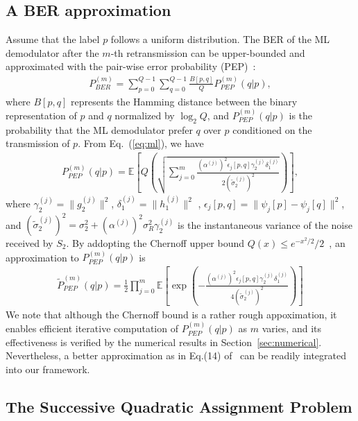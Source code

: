 \documentclass{article}
\begin{document}
\subsection{A BER approximation}
\label{ssec:ber}
Assume that the label $p$ follows a uniform distribution. The BER of
the ML demodulator after the $m$-th retransmission can be upper-bounded and
approximated with the pair-wise error probability (PEP)~\cite{harvind2005symbol}:
\begin{align}
  P_{BER}^{(m)} = \sum_{p=0}^{Q - 1}\sum_{q=0}^{Q - 1}\frac{B[p,
  q]}{Q}P_{PEP}^{(m)}(q|p), \label{eq:P_BER}
\end{align}
where $B[p,q]$ represents the Hamming distance between the binary representation
of $p$ and $q$ normalized by $\log_2Q$, and $P_{PEP}^{(m)}(q|p)$ is the
probability that the ML demodulator prefer $q$ over $p$ conditioned on the
transmission of $p$. From Eq.~(\ref{eq:ml}), we have
\begin{align}
  P_{PEP}^{(m)}(q|p) = \mathbb{E}
  \left[Q\left(\sqrt{\sum_{j=0}^m \frac{(\alpha^{(j)})^2\epsilon_j[p,q]
  \gamma_2^{(j)} \delta_1^{(j)}} {2(\tilde{\sigma}_2^{(j)})^2}}\right)\right],
  \label{eq:PEP_M}
\end{align}
where $\gamma_2^{(j)} = \|g_2^{(j)}\|^2$, $\delta_1^{(j)} = \|h_1^{(j)}\|^2$
, $\epsilon_j[p,q] = \|\psi_j[p]-\psi_j[q]\|^2$, and $(\tilde{\sigma}_2^{(j)})^2
= \sigma_2^2+(\alpha^{(j)})^2\sigma_R^2\gamma_2^{(j)}$ is the instantaneous
variance of the noise received by $S_2$. By addopting the Chernoff upper bound
$Q(x)\leq e^{-x^2/2}/2$~\cite{proakisdigital}, an approximation to
$P_{PEP}^{(m)}(q|p)$ is
\begin{align}
  \tilde{P}_{PEP}^{(m)}(q|p) = \frac{1}{2}\prod_{j=0}^{m} \mathbb{E}
  \left[\exp\left( 
  -\frac{(\alpha^{(j)})^2\epsilon_j[p,q]\gamma_2^{(j)} \delta_1^{(j)}}
  {4(\tilde{\sigma}_2^{(j)})^2}
  \right)\right]
\end{align}
We note that although the Chernoff bound is a rather rough appoximation, it
enables efficient iterative computation of $P_{PEP}^{(m)}(q|p)$ as $m$ varies,
and its effectiveness is verified by the numerical results in
Section~\ref{sec:numerical}. Nevertheless, a better approximation as in Eq.(14)
of~\cite{chiani2003new} can be readily integrated into our framework.

\subsection{The Successive Quadratic Assignment Problem}
\label{ssec:qap}
\end{document}
